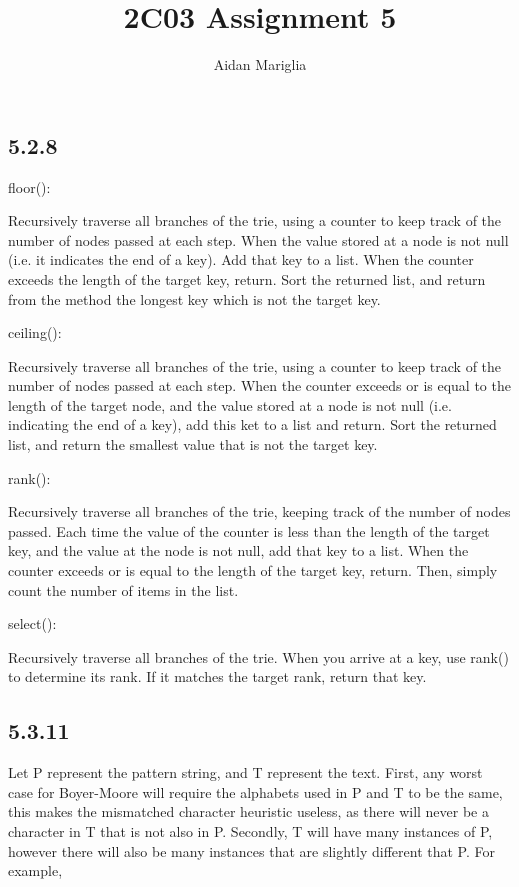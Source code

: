 \documentclass[12pt]{article}
\title{2C03 Assignment 5}
\author{Aidan Mariglia}
\begin{document}
\maketitle

\subsection*{5.2.8}

floor():

\noindent Recursively traverse all branches of the trie, using a counter to 
keep track of the number of nodes passed at each step. When the value stored
at a node is not null (i.e. it indicates the end of a key). Add that key to a
list. When the counter exceeds the length of the target key, return. Sort the
returned list, and return from the method the longest key which is not the
target key.

\medskip
\noindent ceiling():

\noindent Recursively traverse all branches of the trie, using a counter to 
keep track of the number of nodes passed at each step. When the counter exceeds
or is equal to the length of the target node, and the value stored at a node is
not null (i.e. indicating the end of a key), add this ket to a list and return.
Sort the returned list, and return the smallest value that is not the target key.

\medskip
\noindent rank():

\noindent Recursively traverse all branches of the trie, keeping track of the
number of nodes passed. Each time the value of the counter is less than the
length of the target key, and the value at the node is not null, add that key
to a list. When the counter exceeds or is equal to the length of the target
key, return. Then, simply count the number of items in the list.

\medskip
\noindent select():

\noindent Recursively traverse all branches of the trie. When you arrive
at a key, use rank() to determine its rank. If it matches the target rank,
return that key.

\medskip
\noindent

\subsection*{5.3.11}

Let P represent the pattern string, and T represent the text. First,
any worst case for Boyer-Moore will require the alphabets used in P and T to be the same, 
this makes the mismatched character heuristic useless, as there will never be a character
in T that is not also in P. Secondly, T will have many instances of P, however
there will also be many instances that are slightly different that P. For example,\\
\end{document}
